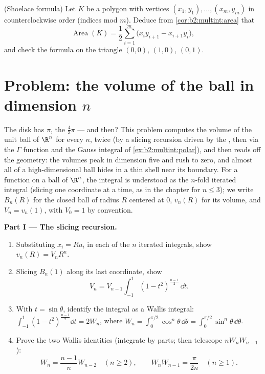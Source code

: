 \begin{exercise}[$\star\star$]\label{exo:b2:multint:12}
(Shoelace formula) Let $K$ be a polygon with vertices $(x_1,
y_1), \dots, (x_m, y_m)$ in counterclockwise order (indices
mod $m$). Deduce from \cref{cor:b2:multint:area} that
\[
\operatorname{Area}(K)
= \frac12\sum_{i=1}^m
\bigl(x_iy_{i+1} - x_{i+1}y_i\bigr) ,
\]
and check the formula on the triangle $(0,0)$, $(1,0)$,
$(0,1)$.
\end{exercise}

\section{Problem: the volume of the ball in dimension $n$}

\begin{problem}[{Weekend problem --- $V_n =
\pi^{n/2}/\Gamma(\frac n2 + 1)$, and the strangeness of high
dimensions}]\label{pb:b2:multint:1}
The disk has  $\pi$, the  $\frac43\pi$ --- and
then? This problem computes the volume of the unit ball of
$\R^n$ for every $n$, twice (by a slicing recursion driven by
the , then via the $\Gamma$ function and the
Gauss integral of \cref{ex:b2:multint:polar}), and then reads
off the geometry: the volumes peak in dimension five and rush
to zero, and almost all of a high-dimensional ball hides in a
thin shell near its boundary. For a  function on a ball of $\R^n$, the
integral is understood as the $n$-fold iterated integral
(slicing one coordinate at a time, as in the chapter for $n
\leq 3$); we write $B_n(R)$ for the closed ball of radius $R$
centered at $0$, $v_n(R)$ for its volume, and $V_n =
v_n(1)$, with $V_0 = 1$ by convention.

\medskip
\noindent\textbf{Part I --- The slicing recursion.}
\begin{enumerate}
  \item Substituting $x_i = Ru_i$ in each of the $n$ iterated
        integrals, show $v_n(R) = V_nR^n$.
  \item Slicing $B_n(1)$ along its last coordinate, show
        \[
        V_n = V_{n-1}\int_{-1}^{1}(1 -
        t^2)^{\frac{n-1}2}\,\dd t .
        \]
  \item With $t = \sin\theta$, identify the integral as a
        Wallis integral: $\int_{-1}^1(1 -
        t^2)^{\frac{n-1}2}\dd t = 2W_n$, where $W_n =
        \int_0^{\pi/2}\cos^n\theta\,\dd\theta =
        \int_0^{\pi/2}\sin^n\theta\,\dd\theta$.
  \item Prove the two Wallis identities (integrate by parts;
        then telescope $nW_nW_{n-1}$):
        \[
        W_n = \frac{n-1}nW_{n-2} \quad (n \geq 2),
        \qquad
        W_nW_{n-1} = \frac{\pi}{2n} \quad (n \geq 1).
        \]
\end{enumerate}


\end{problem}
